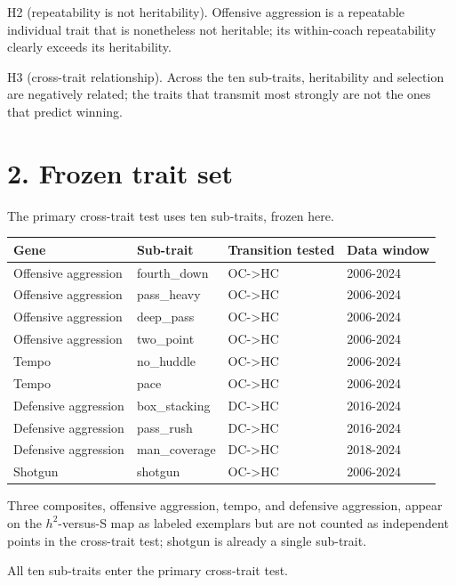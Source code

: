 \documentclass[11pt]{article}
\begin{document}
H2 (repeatability is not heritability). Offensive aggression is a repeatable individual trait that is nonetheless not heritable; its within-coach repeatability clearly exceeds its heritability.

H3 (cross-trait relationship). Across the ten sub-traits, heritability and selection are negatively related; the traits that transmit most strongly are not the ones that predict winning.

\section*{2. Frozen trait set}

The primary cross-trait test uses ten sub-traits, frozen here.

\begin{center}
\begin{tabular}{llll}
\toprule
Gene & Sub-trait & Transition tested & Data window \\
\midrule
Offensive aggression & fourth\_down & OC-\textgreater{}HC & 2006-2024 \\
Offensive aggression & pass\_heavy & OC-\textgreater{}HC & 2006-2024 \\
Offensive aggression & deep\_pass & OC-\textgreater{}HC & 2006-2024 \\
Offensive aggression & two\_point & OC-\textgreater{}HC & 2006-2024 \\
Tempo & no\_huddle & OC-\textgreater{}HC & 2006-2024 \\
Tempo & pace & OC-\textgreater{}HC & 2006-2024 \\
Defensive aggression & box\_stacking & DC-\textgreater{}HC & 2016-2024 \\
Defensive aggression & pass\_rush & DC-\textgreater{}HC & 2016-2024 \\
Defensive aggression & man\_coverage & DC-\textgreater{}HC & 2018-2024 \\
Shotgun & shotgun & OC-\textgreater{}HC & 2006-2024 \\
\bottomrule
\end{tabular}
\end{center}

Three composites, offensive aggression, tempo, and defensive aggression, appear on the $h^{2}$-versus-S map as labeled exemplars but are not counted as independent points in the cross-trait test; shotgun is already a single sub-trait.

All ten sub-traits enter the primary cross-trait test.
\end{document}
